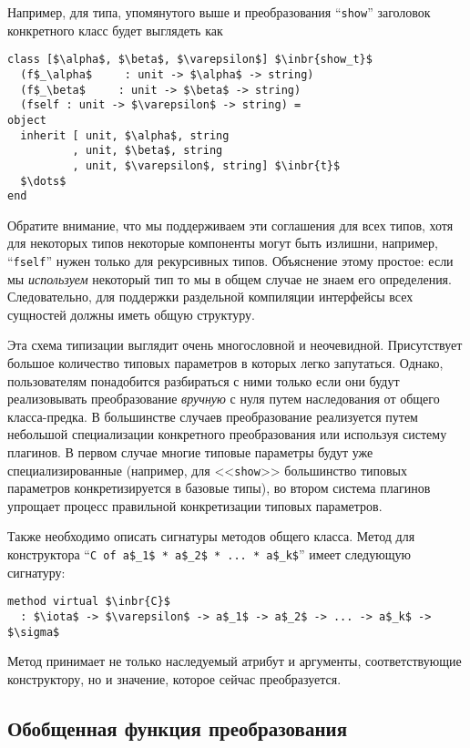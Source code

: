 \noindent Например, для типа, упомянутого выше и преобразования ``\lstinline{show}'' заголовок конкретного класс будет выглядеть как

\begin{lstlisting}
class [$\alpha$, $\beta$, $\varepsilon$] $\inbr{show_t}$ 
  (f$_\alpha$     : unit -> $\alpha$ -> string)
  (f$_\beta$     : unit -> $\beta$ -> string)
  (fself : unit -> $\varepsilon$ -> string) =
object 
  inherit [ unit, $\alpha$, string
          , unit, $\beta$, string
          , unit, $\varepsilon$, string] $\inbr{t}$
  $\dots$
end 
\end{lstlisting}

Обратите внимание, что мы поддерживаем эти соглашения для всех типов, хотя для некоторых типов некоторые компоненты могут быть излишни, например, ``\lstinline{fself}''
нужен только для рекурсивных типов. Объяснение этому простое: если мы \emph{используем} некоторый тип
то мы в общем случае не знаем его определения. Следовательно, для поддержки раздельной компиляции интерфейсы всех сущностей должны иметь общую структуру.

Эта схема типизации выглядит очень многословной и неочевидной. Присутствует большое количество типовых параметров в которых легко запутаться.
Однако, пользователям понадобится разбираться с ними только если они будут реализовывать преобразование \emph{вручную} с нуля путем 
наследования от общего класса-предка.
В большинстве случаев преобразование реализуется путем небольшой специализации конкретного преобразования или используя систему плагинов. 
В первом случае многие типовые параметры будут уже специализированные (например, для  <<\lstinline{show}>> большинство типовых параметров конкретизируется в базовые типы), во втором система плагинов упрощает процесс правильной конкретизации типовых параметров. %

Также необходимо описать сигнатуры методов общего класса. Метод для конструктора  ``\lstinline|C of a$_1$ * a$_2$ * ... * a$_k$|'' имеет следующую сигнатуру:

\begin{lstlisting}
method virtual $\inbr{C}$ 
  : $\iota$ -> $\varepsilon$ -> a$_1$ -> a$_2$ -> ... -> a$_k$ -> $\sigma$
\end{lstlisting}

\noindent Метод принимает не только наследуемый атрибут и аргументы, соответствующие конструктору, но и значение, которое сейчас преобразуется.

\subsection{Обобщенная функция преобразования}
\label{gcata}

